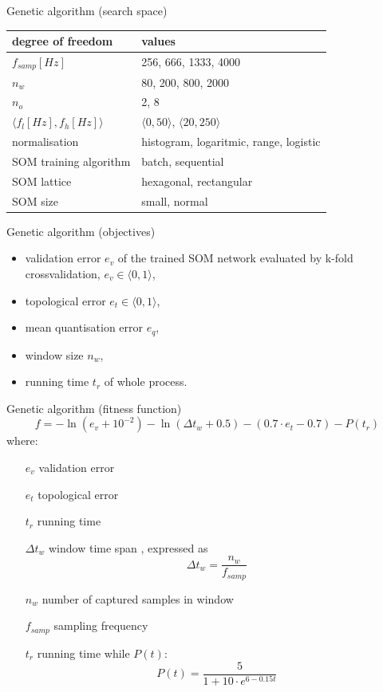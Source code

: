 \documentclass{beamer}
\begin{document}
\begin{frame}{Genetic algorithm (search space)}
	\begin{table}[h]
		\begin{center}
			\begin{tabular}{|l|| l |}
				\hline
				degree of freedom & values \\
				\hline
				\hline
				$ f_{samp} [Hz] $ & 256, 666, 1333, 4000\\
				\hline
				$ n_w $ & 80, 200, 800, 2000 \\
				\hline
				$ n_o $ & 2, 8 \\
				\hline
				$ \langle f_l[Hz], f_h[Hz] \rangle $ & $ \langle 0, 50\rangle $,  
				$ \langle 20, 250\rangle $  \\
				\hline
				normalisation & histogram, logaritmic, range, logistic \\
				\hline
				SOM training algorithm & batch, sequential  \\
				\hline
				SOM lattice & hexagonal, rectangular \\
				\hline
				SOM size  & small, normal \\
				\hline
			\end{tabular}
		\end{center}
	\label{searchspace}
	\end{table}
\end{frame}

\begin{frame}{Genetic algorithm (objectives)}
\begin{itemize}
	\item validation error $ e_v $ of the trained SOM network evaluated by k-fold
	crossvalidation, $ e_v \in \langle 0, 1 \rangle $,
	\item topological error $ e_t \in \langle 0, 1 \rangle $,
	\item mean quantisation error $ e_q $,
	\item window size $ n_w $,
	\item running time $ t_r $ of whole process.
\end{itemize}
\end{frame}

\begin{frame}{Genetic algorithm (fitness function)}
	\[ f = -\ln(e_v+10^{-2 }) - \ln(\Delta t_w+0.5) - (0.7\cdot e_t-0.7) - P(t_r) \]
	\pause
	where:
	\begin{enumerate}
		\item[$ e_v $] validation error
		\item[$ e_t $] topological error
		\item[$ t_r $] running time
		\item[$ \Delta t_w $] window time span\pause
		, expressed as \[  \Delta t_w = \frac{n_w}{f_{samp}}  \]
		\item[$ n_w $] number of captured samples in window
		\item[$ f_{samp} $] sampling frequency
		\item[$ t_r $] running time while $ P(t) $: \[ P(t) = \frac{5}{1+10\cdot e^{6-0.15t}} \]
	\end{enumerate}
\end{frame}
\end{document}
